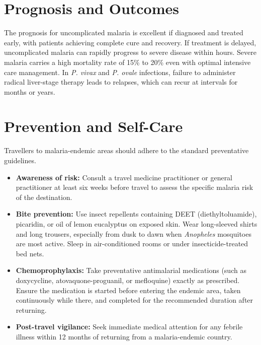 \section*{Prognosis and Outcomes}
The prognosis for uncomplicated malaria is excellent if diagnosed and treated early, with patients achieving complete cure and recovery. If treatment is delayed, uncomplicated malaria can rapidly progress to severe disease within hours. Severe malaria carries a high mortality rate of 15\% to 20\% even with optimal intensive care management. In \textit{P. vivax} and \textit{P. ovale} infections, failure to administer radical liver-stage therapy leads to relapses, which can recur at intervals for months or years.

\section*{Prevention and Self-Care}
Travellers to malaria-endemic areas should adhere to the standard preventative guidelines.
\begin{itemize}
    \item \textbf{Awareness of risk:} Consult a travel medicine practitioner or general practitioner at least six weeks before travel to assess the specific malaria risk of the destination.
    \item \textbf{Bite prevention:} Use insect repellents containing DEET (diethyltoluamide), picaridin, or oil of lemon eucalyptus on exposed skin. Wear long-sleeved shirts and long trousers, especially from dusk to dawn when \textit{Anopheles} mosquitoes are most active. Sleep in air-conditioned rooms or under insecticide-treated bed nets.
    \item \textbf{Chemoprophylaxis:} Take preventative antimalarial medications (such as doxycycline, atovaquone-proguanil, or mefloquine) exactly as prescribed. Ensure the medication is started before entering the endemic area, taken continuously while there, and completed for the recommended duration after returning.
    \item \textbf{Post-travel vigilance:} Seek immediate medical attention for any febrile illness within 12 months of returning from a malaria-endemic country.
\end{itemize}

